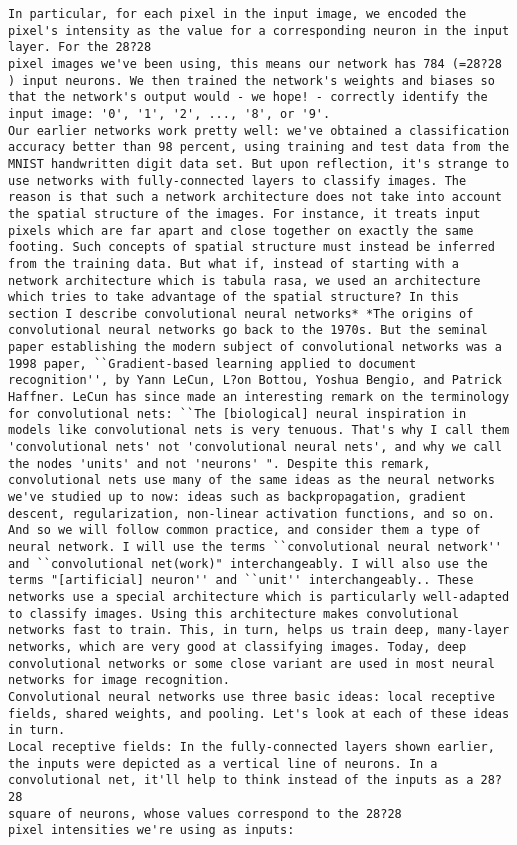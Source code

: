 \begin{lstlisting}
In particular, for each pixel in the input image, we encoded the pixel's intensity as the value for a corresponding neuron in the input layer. For the 28?28
pixel images we've been using, this means our network has 784 (=28?28
) input neurons. We then trained the network's weights and biases so that the network's output would - we hope! - correctly identify the input image: '0', '1', '2', ..., '8', or '9'.
Our earlier networks work pretty well: we've obtained a classification accuracy better than 98 percent, using training and test data from the MNIST handwritten digit data set. But upon reflection, it's strange to use networks with fully-connected layers to classify images. The reason is that such a network architecture does not take into account the spatial structure of the images. For instance, it treats input pixels which are far apart and close together on exactly the same footing. Such concepts of spatial structure must instead be inferred from the training data. But what if, instead of starting with a network architecture which is tabula rasa, we used an architecture which tries to take advantage of the spatial structure? In this section I describe convolutional neural networks* *The origins of convolutional neural networks go back to the 1970s. But the seminal paper establishing the modern subject of convolutional networks was a 1998 paper, ``Gradient-based learning applied to document recognition'', by Yann LeCun, L?on Bottou, Yoshua Bengio, and Patrick Haffner. LeCun has since made an interesting remark on the terminology for convolutional nets: ``The [biological] neural inspiration in models like convolutional nets is very tenuous. That's why I call them 'convolutional nets' not 'convolutional neural nets', and why we call the nodes 'units' and not 'neurons' ". Despite this remark, convolutional nets use many of the same ideas as the neural networks we've studied up to now: ideas such as backpropagation, gradient descent, regularization, non-linear activation functions, and so on. And so we will follow common practice, and consider them a type of neural network. I will use the terms ``convolutional neural network'' and ``convolutional net(work)" interchangeably. I will also use the terms "[artificial] neuron'' and ``unit'' interchangeably.. These networks use a special architecture which is particularly well-adapted to classify images. Using this architecture makes convolutional networks fast to train. This, in turn, helps us train deep, many-layer networks, which are very good at classifying images. Today, deep convolutional networks or some close variant are used in most neural networks for image recognition.
Convolutional neural networks use three basic ideas: local receptive fields, shared weights, and pooling. Let's look at each of these ideas in turn.
Local receptive fields: In the fully-connected layers shown earlier, the inputs were depicted as a vertical line of neurons. In a convolutional net, it'll help to think instead of the inputs as a 28?28
square of neurons, whose values correspond to the 28?28
pixel intensities we're using as inputs:


\end{lstlisting}

